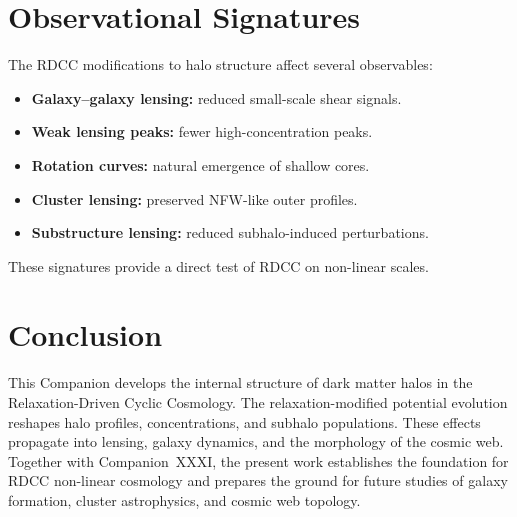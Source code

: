 \documentclass[11pt,a4paper]{article}
\begin{document}
\section{Observational Signatures}

The RDCC modifications to halo structure affect several observables:

\begin{itemize}[leftmargin=1.2cm]
    \item \textbf{Galaxy--galaxy lensing:} reduced small-scale shear signals.
    \item \textbf{Weak lensing peaks:} fewer high-concentration peaks.
    \item \textbf{Rotation curves:} natural emergence of shallow cores.
    \item \textbf{Cluster lensing:} preserved NFW-like outer profiles.
    \item \textbf{Substructure lensing:} reduced subhalo-induced perturbations.
\end{itemize}

These signatures provide a direct test of RDCC on non-linear scales.
\section{Conclusion}

This Companion develops the internal structure of dark matter halos in the 
Relaxation-Driven Cyclic Cosmology. The relaxation-modified potential evolution 
reshapes halo profiles, concentrations, and subhalo populations. These effects 
propagate into lensing, galaxy dynamics, and the morphology of the cosmic web. 
Together with Companion~XXXI, the present work establishes the foundation for 
RDCC non-linear cosmology and prepares the ground for future studies of galaxy 
formation, cluster astrophysics, and cosmic web topology.

\end{document}
